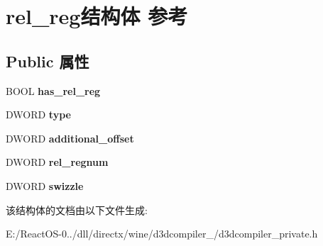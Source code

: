 \hypertarget{structrel__reg}{}\section{rel\+\_\+reg结构体 参考}
\label{structrel__reg}
\subsection*{Public 属性}
\begin{DoxyCompactItemize}
\item 
\mbox{\label{structrel__reg_ae8a3111ae2a6839fe48e6da61df8d0a1}} 
B\+O\+OL {\bfseries has\+\_\+rel\+\_\+reg}
\item 
\mbox{\label{structrel__reg_a81e0072a18de396a42373352fcfb2ba3}} 
D\+W\+O\+RD {\bfseries type}
\item 
\mbox{\label{structrel__reg_aa6c16d6cc103ff78d2d0d46c810ff844}} 
D\+W\+O\+RD {\bfseries additional\+\_\+offset}
\item 
\mbox{\label{structrel__reg_abe33ec074e50410edc4117c06ad3fc62}} 
D\+W\+O\+RD {\bfseries rel\+\_\+regnum}
\item 
\mbox{\label{structrel__reg_ae5e308c0b5f8eaea33c6491ff4f13869}} 
D\+W\+O\+RD {\bfseries swizzle}
\end{DoxyCompactItemize}


该结构体的文档由以下文件生成\+:\begin{DoxyCompactItemize}
\item 
E\+:/\+React\+O\+S-\/0../dll/directx/wine/d3dcompiler\+\_/d3dcompiler\+\_\+private.\+h\end{DoxyCompactItemize}

